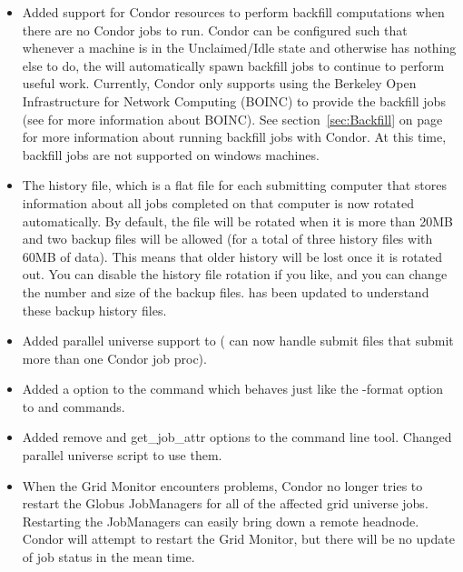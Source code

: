 \begin{itemize}

\item Added support for Condor resources to perform backfill
  computations when there are no Condor jobs to run.
  Condor can be configured such that whenever a machine is in the
  Unclaimed/Idle state and otherwise has nothing else to do, the
   will automatically spawn backfill jobs to continue
  to perform useful work.
  Currently, Condor only supports using the Berkeley Open
  Infrastructure for Network Computing (BOINC) to provide the backfill
  jobs (see  for more information about
  BOINC).
  See section~\ref{sec:Backfill} on page~\pageref{sec:Backfill} for
  more information about running backfill jobs with Condor.
  At this time, backfill jobs are not supported on windows machines.

\item The history file, which is a flat file for each submitting
computer that stores information about all jobs completed on that
computer is now rotated automatically. By default, the file will be
rotated when it is more than 20MB and two backup files will be allowed
(for a total of three history files with 60MB of data). This means
that older history will be lost once it is rotated out. You can
disable the history file rotation if you like, and you can change the
number and size of the backup files.  has been updated
to understand these backup history files. 

\item Added parallel universe support to  (
can now handle submit files that submit more than one Condor job proc).

\item Added a  option to the  command which
behaves just like the -format option to  and 
commands.

\item Added remove and get\_job\_attr options to the 
command line tool.  Changed parallel universe script to use them.

\item When the Grid Monitor encounters problems, Condor no longer tries
to restart the Globus JobManagers for all of the affected grid universe
jobs. Restarting the JobManagers can easily bring down a remote headnode.
Condor will attempt to restart the Grid Monitor, but there will be
no update of job status in the mean time. 


\end{itemize}
